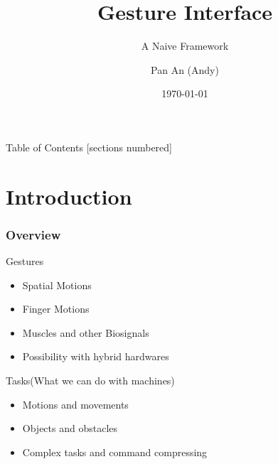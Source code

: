 \documentclass[10pt]{beamer}
\title{Gesture Interface}
\subtitle{A Naive Framework}
\date{\today}
\author{Pan An (Andy)}
\institute{National University of Singapore}
\begin{document}
\maketitle

\begin{frame}{Table of Contents}
  [sections numbered]
  \tableofcontents[hideallsubsections]
\end{frame}

\section{Introduction}

\begin{frame}
  \frametitle{Overview}
  \begin{block}{Gestures}
    \begin{itemize}
    \item Spatial Motions
    \item Finger Motions
    \item Muscles and other Biosignals
    \item Possibility with hybrid hardwares
    \end{itemize}
  \end{block}

  \begin{block}{Tasks(What we can do with machines)}
    \begin{itemize}
    \item Motions and movements
    \item Objects and obstacles
    \item Complex tasks and command compressing
    \end{itemize}
  \end{block}
\end{frame}
\end{document}
